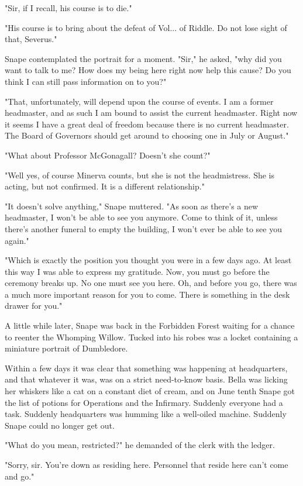 \documentclass[a4paper,11pt]{article}
\begin{document}
"Sir, if I recall, his course is to die."

"His course is to bring about the defeat of Vol... of Riddle. Do not lose sight of that, Severus."

Snape contemplated the portrait for a moment. "Sir," he asked, "why did you want to talk to me? How does my being here right now help this cause? Do you think I can still pass information on to you?"

"That, unfortunately, will depend upon the course of events. I am a former headmaster, and as such I am bound to assist the current headmaster. Right now it seems I have a great deal of freedom because there is no current headmaster. The Board of Governors should get around to choosing one in July or August."

"What about Professor McGonagall? Doesn't she count?"

"Well yes, of course Minerva counts, but she is not the headmistress. She is acting, but not confirmed. It is a different relationship."

"It doesn't solve anything," Snape muttered. "As soon as there's a new headmaster, I won't be able to see you anymore. Come to think of it, unless there's another funeral to empty the building, I won't ever be able to see you again."

"Which is exactly the position you thought you were in a few days ago. At least this way I was able to express my gratitude. Now, you must go before the ceremony breaks up. No one must see you here. Oh, and before you go, there was a much more important reason for you to come. There is something in the desk drawer for you."

A little while later, Snape was back in the Forbidden Forest waiting for a chance to reenter the Whomping Willow. Tucked into his robes was a locket containing a miniature portrait of Dumbledore.

Within a few days it was clear that something was happening at headquarters, and that whatever it was, was on a strict need-to-know basis. Bella was licking her whiskers like a cat on a constant diet of cream, and on June tenth Snape got the list of potions for Operations and the Infirmary. Suddenly everyone had a task. Suddenly headquarters was humming like a well-oiled machine. Suddenly Snape could no longer get out.

"What do you mean, restricted?" he demanded of the clerk with the ledger.

"Sorry, sir. You're down as residing here. Personnel that reside here can't come and go."
\end{document}
